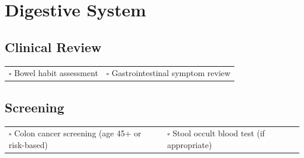 
\section{Digestive System}
\label{sec:digestion}

\subsection{Clinical Review}

\begin{tabular}{p{9cm} p{8cm}}
$\square$ Bowel habit assessment & $\square$ Gastrointestinal symptom review \\ 
\end{tabular}

\subsection{Screening}

\begin{tabular}{p{9cm} p{8cm}}
$\square$ Colon cancer screening (age 45+ or risk-based) & $\square$ Stool occult blood test (if appropriate) \\ 
\end{tabular}

